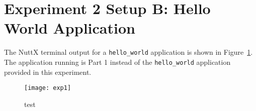 \section*{Experiment 2 Setup B: Hello World Application}
The NuttX terminal output for a \texttt{hello\_world} application is shown in Figure~\ref{fig:exp2b}. The application running is Part 1 instead of the \texttt{hello\_world} application provided in this experiment.

\begin{figure}[htp]
\centering
\texttt{[image: exp1]}
\caption[short]{test}\label{fig:exp2b}
\end{figure}